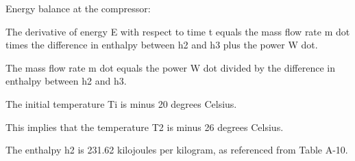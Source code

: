Energy balance at the compressor:

The derivative of energy E with respect to time t equals the mass flow rate m dot times the difference in enthalpy between h2 and h3 plus the power W dot.

The mass flow rate m dot equals the power W dot divided by the difference in enthalpy between h2 and h3.

The initial temperature Ti is minus 20 degrees Celsius.

This implies that the temperature T2 is minus 26 degrees Celsius.

The enthalpy h2 is 231.62 kilojoules per kilogram, as referenced from Table A-10.